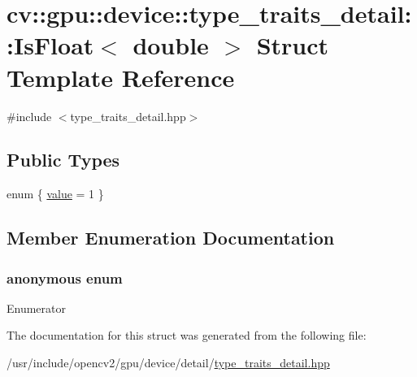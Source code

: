 \hypertarget{structcv_1_1gpu_1_1device_1_1type__traits__detail_1_1IsFloat_3_01double_01_4}{\section{cv\-:\-:gpu\-:\-:device\-:\-:type\-\_\-traits\-\_\-detail\-:\-:Is\-Float$<$ double $>$ Struct Template Reference}
\label{structcv_1_1gpu_1_1device_1_1type__traits__detail_1_1IsFloat_3_01double_01_4}
}


{\ttfamily \#include $<$type\-\_\-traits\-\_\-detail.\-hpp$>$}

\subsection*{Public Types}
\begin{DoxyCompactItemize}
\item 
enum \{ \hyperlink{structcv_1_1gpu_1_1device_1_1type__traits__detail_1_1IsFloat_3_01double_01_4_a688219d35eef904b7362a9133205140ea1f833c040e5e6a4b781d055252fb836d}{value} = 1
 \}
\end{DoxyCompactItemize}


\subsection{Member Enumeration Documentation}
\hypertarget{structcv_1_1gpu_1_1device_1_1type__traits__detail_1_1IsFloat_3_01double_01_4_a688219d35eef904b7362a9133205140e}{\subsubsection[{anonymous enum}]{\setlength{\rightskip}{0pt plus 5cm}anonymous enum}}\label{structcv_1_1gpu_1_1device_1_1type__traits__detail_1_1IsFloat_3_01double_01_4_a688219d35eef904b7362a9133205140e}
\begin{Desc}
\item[Enumerator]\par
\begin{description}
\item[{\em 
\hypertarget{structcv_1_1gpu_1_1device_1_1type__traits__detail_1_1IsFloat_3_01double_01_4_a688219d35eef904b7362a9133205140ea1f833c040e5e6a4b781d055252fb836d}{value}\label{structcv_1_1gpu_1_1device_1_1type__traits__detail_1_1IsFloat_3_01double_01_4_a688219d35eef904b7362a9133205140ea1f833c040e5e6a4b781d055252fb836d}
}]\end{description}
\end{Desc}


The documentation for this struct was generated from the following file\-:\begin{DoxyCompactItemize}
\item 
/usr/include/opencv2/gpu/device/detail/\hyperlink{type__traits__detail_8hpp}{type\-\_\-traits\-\_\-detail.\-hpp}\end{DoxyCompactItemize}
